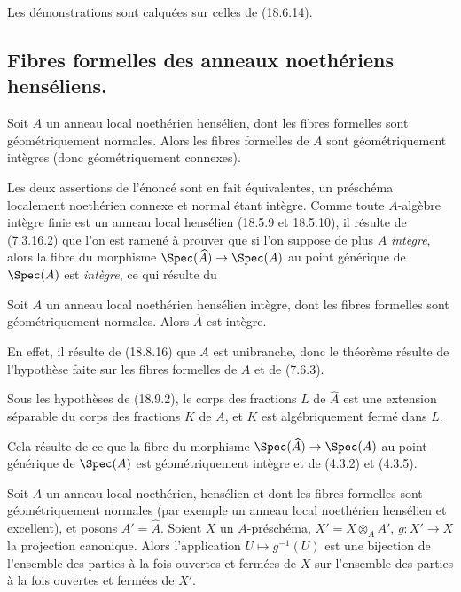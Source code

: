 Les démonstrations sont calquées sur celles de (18.6.14).

\subsection{Fibres formelles des anneaux noethériens henséliens.}

\begin{theorem}[18.9.1]
\label{IV.18.9.1}
Soit $A$ un anneau local noethérien hensélien, dont les fibres formelles sont géométriquement normales. Alors les fibres formelles de $A$ sont géométriquement intègres (donc géométriquement connexes).
\end{theorem}

Les deux assertions de l'énoncé sont en fait équivalentes, un préschéma localement noethérien connexe et normal étant intègre. Comme toute $A$-algèbre intègre finie est un anneau local hensélien (18.5.9 et 18.5.10), il résulte de (7.3.16.2) que l'on est ramené à prouver que si l'on suppose de plus $A$ \emph{intègre}, alors la fibre du morphisme $\Spec(\widehat A)\to\Spec(A)$ au point générique de $\Spec(A)$ est \emph{intègre}, ce qui résulte du

\begin{corollary}[18.9.2]
\label{IV.18.9.2}
Soit $A$ un anneau local noethérien hensélien intègre, dont les fibres formelles sont géométriquement normales. Alors $\widehat A$ est intègre.
\end{corollary}

En effet, il résulte de (18.8.16) que $A$ est unibranche, donc le théorème résulte de l'hypothèse faite sur les fibres formelles de $A$ et de (7.6.3).

\begin{corollary}[18.9.3]
\label{IV.18.9.3}
Sous les hypothèses de (18.9.2), le corps des fractions $L$ de $\widehat A$ est une extension séparable du corps des fractions $K$ de $A$, et $K$ est algébriquement fermé dans $L$.
\end{corollary}

Cela résulte de ce que la fibre du morphisme $\Spec(\widehat A)\to\Spec(A)$ au point générique de $\Spec(A)$ est géométriquement intègre et de (4.3.2) et (4.3.5).

\begin{corollary}[18.9.4]
\label{IV.18.9.4}
Soit $A$ un anneau local noethérien, hensélien et dont les fibres formelles sont géométriquement normales (par exemple un anneau local noethérien hensélien et excellent), et posons $A'=\widehat A$. Soient $X$ un $A$-préschéma, $X'=X\otimes_A A'$, $g:X'\to X$ la projection canonique. Alors l'application $U\mapsto g^{-1}(U)$ est une bijection de l'ensemble des parties à la fois ouvertes et fermées de $X$ sur l'ensemble des parties à la fois ouvertes et fermées de $X'$.
\end{corollary}

